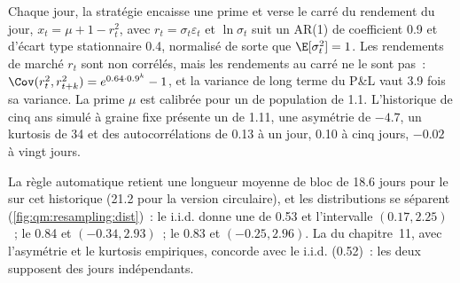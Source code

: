 \begin{example}\label{ex:qm:resampling:seller}
Chaque jour, la stratégie encaisse une prime et verse le carré du rendement du jour, $x_t = \mu + 1 - r_t^2$, avec $r_t = \sigma_t\varepsilon_t$ et
$\ln\sigma_t$ suit un AR(1) de coefficient 0.9 et d'écart type stationnaire 0.4, normalisé de sorte que $\E[\sigma_t^2] = 1$. Les rendements de marché
$r_t$ sont non corrélés, mais les rendements au carré ne le sont pas~: $\Cov(r_t^2, r_{t+k}^2) = e^{0.64 \cdot 0.9^k} - 1$, et la variance de long terme du P\&L
vaut 3.9 fois sa variance. La prime $\mu$ est calibrée pour un  de population de 1.1. L'historique de cinq ans simulé à graine fixe
présente un  de 1.11, une asymétrie de $-4.7$, un kurtosis de 34 et des autocorrélations de 0.13 à un jour, 0.10 à cinq jours,
$-0.02$ à vingt jours.
\end{example}

La règle automatique retient une longueur moyenne de bloc de 18.6 jours pour le  sur cet historique (21.2 pour la version circulaire), et
les distributions  se séparent (\cref{fig:qm:resampling:dist})~: le  i.i.d. donne une  de 0.53 et
l'intervalle $(0.17, 2.25)$~; le  0.84 et $(-0.34, 2.93)$~; le  0.83 et $(-0.25, 2.96)$.
La  du chapitre~11, avec l'asymétrie et le kurtosis empiriques, concorde avec le  i.i.d. (0.52)~: les deux supposent des
jours indépendants.

